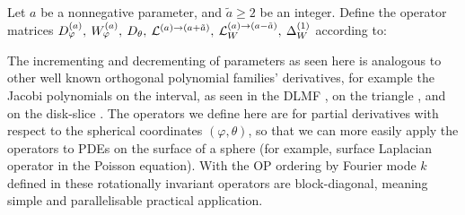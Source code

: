 \begin{definition}\label{def:sc:differentialoperators}
	Let $a$ be a nonnegative parameter, and $\tilde a \ge 2$ be an integer. Define the operator matrices $D_\varphi^{(a)}, \: W_\varphi^{(a)}, \: D_\theta, \: \mathcal{L}^{(a)\to(a+\tilde a)}, \: \mathcal{L}_W^{(a)\to(a-\tilde a)}, \: \Delta^{(1)}_W$ according to:
\end{definition}

The incrementing and decrementing of parameters as seen here is analogous to other well known orthogonal polynomial families' derivatives, for example the Jacobi polynomials on the interval, as seen in the DLMF \cite[(18.9.3)]{DLMF}, on the triangle \cite{olver2018recurrence}, and on the disk-slice \cite{snowball2019sparse}. The operators we define here are for partial derivatives with respect to the spherical coordinates $(\varphi, \theta)$, so that we can more easily apply the operators to PDEs on the surface of a sphere (for example, surface Laplacian operator in the Poisson equation). With the OP ordering by Fourier mode $k$ defined in  these rotationally invariant operators are block-diagonal, meaning simple and parallelisable practical application.

